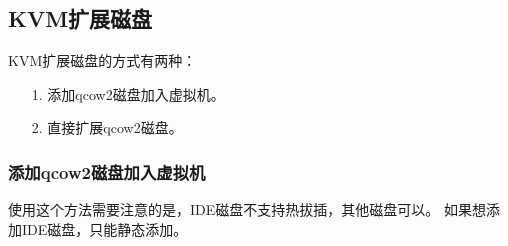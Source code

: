 \documentclass[a4paper,left=2.5cm,right=2.5cm,11pt]{article}
\begin{document}
\subsection{KVM扩展磁盘}
	KVM扩展磁盘的方式有两种：
	\begin{itemize}
		\item[1.] 添加qcow2磁盘加入虚拟机。
		\item[2.] 直接扩展qcow2磁盘。
	\end{itemize}

\subsubsection{添加qcow2磁盘加入虚拟机}
	使用这个方法需要注意的是，IDE磁盘不支持热拔插，其他磁盘可以。
	如果想添加IDE磁盘，只能静态添加。\par
\end{document}
